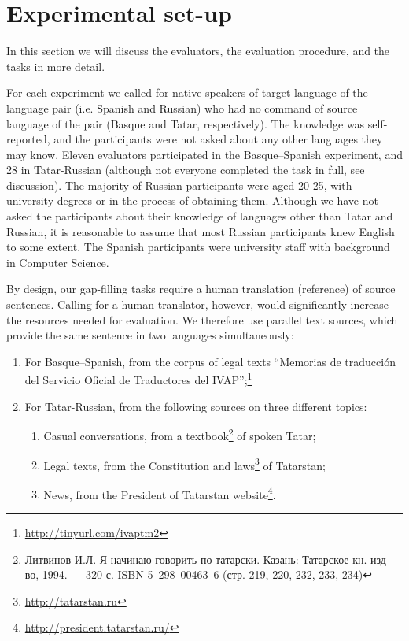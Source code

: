 \documentclass[11pt]{article}
\newcommand{\comment}[1]{}
\newcommand{\rus}[1]{\foreignlanguage{russian}{#1}}
\begin{document}
\section{Experimental set-up}
\label{sec:setup}

In this section we will discuss the evaluators, the evaluation procedure, and the tasks in more detail.

For each experiment we called for native speakers of target language of the language pair (i.e.
Spanish and Russian) who had no command of source language of the pair (Basque
and Tatar, respectively). The knowledge was self-reported, and the participants were not asked about any other languages they may know. \comment{EA 12: should I elaborate on this? Write that Basque is not mutually understandable with anything? I am pretty sure we had no one from Tatarstan, but there may have been someone who knows some Bashkir, which might have helped them. Also, with Tatar, I think, Russian loanwords help more than anything else. } Eleven evaluators participated in the Basque--Spanish experiment, and 28 in Tatar-Russian (although not everyone completed the task
in full, see discussion). The majority of Russian participants were aged 20-25, with university degrees or in the process of obtaining them. Although we have not asked the participants about their knowledge of languages other than Tatar and Russian, it is reasonable to assume that most Russian participants knew English to some extent. The Spanish participants were university staff with background in Computer Science.

By design, our gap-filling tasks require a human translation (reference) of source sentences. Calling for a human translator, however, would significantly increase the resources needed for evaluation. We therefore use parallel text sources, which provide the same sentence in two languages simultaneously:
\begin{enumerate}
\item  For Basque--Spanish, from the corpus of legal texts ``Memorias de traducci\'on del
Servicio Oficial de Traductores del IVAP'';\footnote{\url{http://tinyurl.com/ivaptm2}} 
\item  For Tatar-Russian, from the following sources on three different topics:
  \begin{enumerate}
    \item  Casual conversations, from a textbook\footnote{\rus{Литвинов И.Л. Я начинаю говорить по-татарски. Казань: Татарское кн. изд-во, 1994. — 320 с. ISBN 5--298--00463--6 (стр. 219, 220, 232, 233, 234)}} of spoken Tatar;
    \item  Legal texts, from the Constitution and laws\footnote{\url{http://tatarstan.ru}} of Tatarstan;
    \item  News, from the President of Tatarstan website\footnote{\url{http://president.tatarstan.ru/}}.
  \end{enumerate}
\end{enumerate}
\end{document}
